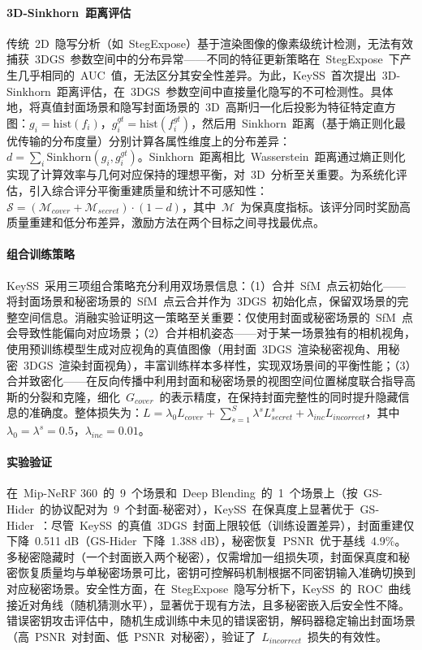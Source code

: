 \paragraph{3D-Sinkhorn~距离评估}传统~2D~隐写分析（如~StegExpose）基于渲染图像的像素级统计检测，无法有效捕获~3DGS~参数空间中的分布异常——不同的特征更新策略在~StegExpose~下产生几乎相同的~AUC~值，无法区分其安全性差异。为此，KeySS~首次提出~3D-Sinkhorn~距离评估，在~3DGS~参数空间中直接量化隐写的不可检测性。具体地，将真值封面场景和隐写封面场景的~3D~高斯归一化后投影为特征特定直方图：$g_i = \mathrm{hist}(f_i)$，$g_i^{gt} = \mathrm{hist}(f_i^{gt})$，然后用~Sinkhorn~距离（基于熵正则化最优传输的分布度量）分别计算各属性维度上的分布差异：$d = \sum_i \mathrm{Sinkhorn}(g_i, g_i^{gt})$。Sinkhorn~距离相比~Wasserstein~距离通过熵正则化实现了计算效率与几何对应保持的理想平衡，对~3D~分析至关重要。为系统化评估，引入综合评分平衡重建质量和统计不可感知性：$\mathcal{S} = (\mathcal{M}_{cover} + \mathcal{M}_{secret}) \cdot (1 - d)$，其中~$\mathcal{M}$~为保真度指标。该评分同时奖励高质量重建和低分布差异，激励方法在两个目标之间寻找最优点。

\paragraph{组合训练策略}KeySS~采用三项组合策略充分利用双场景信息：（1）合并~SfM~点云初始化——将封面场景和秘密场景的~SfM~点云合并作为~3DGS~初始化点，保留双场景的完整空间信息。消融实验证明这一策略至关重要：仅使用封面或秘密场景的~SfM~点会导致性能偏向对应场景；（2）合并相机姿态——对于某一场景独有的相机视角，使用预训练模型生成对应视角的真值图像（用封面~3DGS~渲染秘密视角、用秘密~3DGS~渲染封面视角），丰富训练样本多样性，实现双场景间的平衡性能；（3）合并致密化——在反向传播中利用封面和秘密场景的视图空间位置梯度联合指导高斯的分裂和克隆，细化~$G_{cover}$~的表示精度，在保持封面完整性的同时提升隐藏信息的准确度。整体损失为：$L = \lambda_0 L_{cover} + \sum_{s=1}^{S} \lambda^s L_{secret}^s + \lambda_{inc} L_{incorrect}$，其中~$\lambda_0 = \lambda^s = 0.5$，$\lambda_{inc} = 0.01$。

\paragraph{实验验证}在~Mip-NeRF 360~的~9~个场景和~Deep Blending~的~1~个场景上（按~GS-Hider~的协议配对为~9~个封面-秘密对），KeySS~在保真度上显著优于~GS-Hider~：尽管~KeySS~的真值~3DGS~封面上限较低（训练设置差异），封面重建仅下降~0.511 dB（GS-Hider~下降~1.388 dB），秘密恢复~PSNR~优于基线~4.9\%。多秘密隐藏时（一个封面嵌入两个秘密），仅需增加一组损失项，封面保真度和秘密恢复质量均与单秘密场景可比，密钥可控解码机制根据不同密钥输入准确切换到对应秘密场景。安全性方面，在~StegExpose~隐写分析下，KeySS~的~ROC~曲线接近对角线（随机猜测水平），显著优于现有方法，且多秘密嵌入后安全性不降。错误密钥攻击评估中，随机生成训练中未见的错误密钥，解码器稳定输出封面场景（高~PSNR~对封面、低~PSNR~对秘密），验证了~$L_{incorrect}$~损失的有效性。

